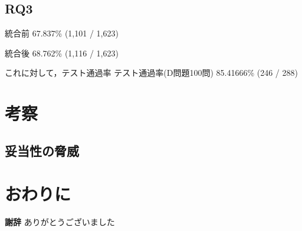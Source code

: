 \documentclass[submit,techrep,noauthor]{ipsj}
\begin{document}
\subsection{RQ3}
統合前
67.837\% (1,101 / 1,623)

統合後
68.762\% (1,116 / 1,623)

これに対して，テスト通過率
テスト通過率(D問題100問)
85.41666\% (246 / 288)

\section{考察}
\label{sec:discussion}
%
\subsection{妥当性の脅威}

\section{おわりに}
\label{sec:conclusion}

\textbf{謝辞} ありがとうございました



\end{document}
